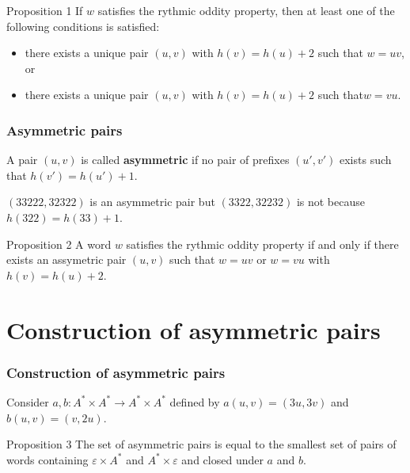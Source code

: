 \documentclass{beamer}
\theoremstyle{definition}
\begin{document}
\begin{frame}
\begin{block}{Proposition 1}
If $w$ satisfies the rythmic oddity property, then at least one of the following conditions is
satisfied:
\begin{itemize}
\item there exists a unique pair $(u,v)$ with $h(v)=h(u)+2$ such that $w=uv$, or 
\item there exists a unique pair $(u,v)$ with $h(v)=h(u)+2$ such that$w=vu$. 
\end{itemize}
\end{block}



\end{frame}
\begin{frame}
\frametitle{Asymmetric pairs}
A pair $(u,v)$ is called \textbf{asymmetric} if no pair of prefixes $(u',v')$ exists such that $h(v')=h(u')+1$. 

\begin{example}
$(33222,32322)$ is an asymmetric pair but $(3322,32232)$ is not because $h(322)=h(33)+1$. 
\end{example}
\begin{block}{Proposition 2}
A word $w$ satisfies the rythmic oddity property if and only if there exists an assymetric pair $(u,v)$ such that $w=uv$ or $w=vu$ with $h(v)=h(u)+2$. 
\end{block}
\end{frame}


\section{Construction of asymmetric pairs}

\begin{frame}
\frametitle{Construction of asymmetric pairs}
Consider $a,b:A^*\times A^*\to A^*\times A^*$ defined by $a(u,v)=(3u,3v)$ and $b(u,v)=(v,2u)$. 

\begin{block}{Proposition 3}
The set of asymmetric pairs is equal to the smallest set of pairs of words containing $\varepsilon\times A^*$ and $A^*\times\varepsilon$ and closed under $a$ and $b$. 
\end{block}
\end{frame}
\end{document}
